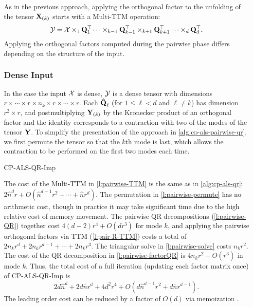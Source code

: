 \documentclass{article}
\newcommand{\mat}[1]{\mathbf{#1}}
\newcommand{\M}[2][]{\bm{#1{\mathbf{\MakeUppercase{#2}}}}} 		%
\newcommand{\T}[2][]{#1{\mathbf{\cal{#2}}}} 						%
\begin{document}
As in the previous approach, applying the orthogonal factor to the unfolding of the tensor $\M{X}_{(k)}$ starts with a Multi-TTM operation:
$$\T{Y} =  \T{X} \times_1 \mat{Q}_1^\top \dots \times_{k-1} \mat{Q}_{k-1}^\top \times_{k+1} \mat{Q}_{k+1}^\top \dots \times_d \mat{Q}_d^\top.$$
Applying the orthogonal factors computed during the pairwise phase differs depending on the structure of the input.

\subsubsection{Dense Input}

In the case the input $\T{X}$ is dense, $\T{Y}$ is a dense tensor with dimensions $r\times \cdots \times r \times n_k \times r \times \cdots \times r$.
Each $\M[\hat]{Q}_\ell$ (for $1\leq \ell < d$ and $\ell \neq k$) has dimension $r^2 \times r$, and postmultiplying $\M{Y}_{(k)}$ by the Kronecker product of an orthogonal factor and the identity corresponds to a contraction with two of the modes of the tensor $\M{Y}$.
To simplify the presentation of the approach in \cref{alg:cp-als-pairwise-qr}, we first permute the tensor so that the $k$th mode is last, which allows the contraction to be performed on the first two modes each time.
 
\begin{algorithm}
  \caption{CP-ALS-QR-Imp}
  \label{alg:cp-als-pairwise-qr}
  
\end{algorithm}

The cost of the Multi-TTM in \cref{l:pairwise-TTM} is the same as in \cref{alg:cp-als-qr}: $2\hat{n}^dr+O(\hat{n}^{d-1}r^2 + \cdots + \hat{n}r^d)$.
The permutation in \cref{l:pairwise-permute} has no arithmetic cost, though in practice it may take significant time due to the high relative cost of memory movement.
The pairwise QR decompositions (\cref{l:pairwise-QR}) together cost $4(d-2)r^4 + O(dr^3)$ for mode $k$, and applying the pairwise orthogonal factors via TTM (\cref{l:pair-R-TTM}) costs a total of $2n_kr^d+2n_kr^{d-1}+\cdots+2n_kr^3$.
The triangular solve in \cref{l:pairwise-solve} costs $n_kr^2$.
The cost of the QR decomposition in \cref{l:pairwise-factorQR} is $4n_kr^2+O(r^3)$ in mode $k$.
Thus, the total cost of a full iteration (updating each factor matrix once) of CP-ALS-QR-Imp is
$$ 2d\hat{n}^d + 2d\bar{n}r^d + 4d^2r^4 + O(d\hat{n}^{d-1}r^2 + d\bar{n}r^{d-1}). $$
The leading order cost can be reduced by a factor of $O(d)$ via memoization \cite{KR19}.
\end{document}
